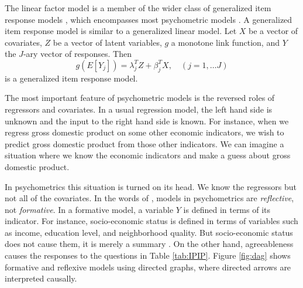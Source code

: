 The linear factor model is a member of the wider class of generalized item response models \parencite{Mellenbergh1994-iy}, which encompasses most psychometric models \parencite[Chapter 3.1]{Borsboom2005-iq}. A generalized item response model is similar to a generalized linear model. Let $X$ be a vector of covariates, $Z$ be a vector of latent variables, $g$ a monotone link function, and $Y$ the $J$-ary vector of responses. Then 
\begin{equation}
g(E[Y_{j}])=\lambda_{j}^{T}Z+\beta_{j}^{T}X,\quad(j=1,\ldots J)\label{eq:GLIRT model}
\end{equation}
is a generalized item response model.

The most important feature of psychometric models is the reversed roles of regressors and covariates. In a usual regression model, the left hand side is unknown and the input to the right hand side is known. For instance, when we regress gross domestic product on some other economic indicators, we wish to predict gross domestic product from those other indicators. We can imagine a situation where we know the economic indicators and make a guess about gross domestic product. 

In psychometrics this situation is turned on its head. We know the regressors but not all of the covariates. In the words of \textcite[p. 61]{Borsboom2005-iq}, models in psychometrics are \emph{reflective}, not \emph{formative}. In a formative model, a variable $Y$ is defined in terms of its indicator. For instance, socio-economic status is defined in terms of variables such as income, education level, and neighborhood quality. But socio-economic status does not cause them, it is merely a summary \parencite[p. 62]{Borsboom2005-iq}. On the other hand, agreeableness causes the responses to the questions in Table \ref{tab:IPIP}. Figure \ref{fig:dag} shows formative and reflexive models using directed graphs, where directed arrows are interpreted causally.

